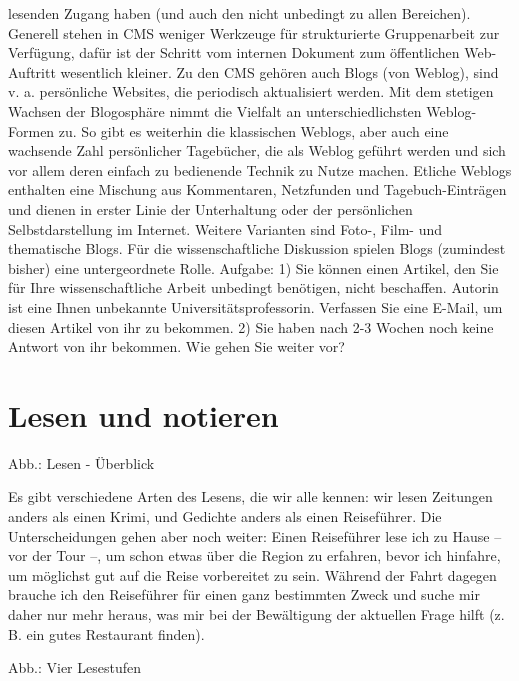 \documentclass[]{book}
\theoremstyle{definition}
\theoremstyle{definition}
\theoremstyle{definition}
\theoremstyle{remark}
\begin{document}
lesenden Zugang haben (und auch den nicht unbedingt zu allen Bereichen).
Generell stehen in CMS weniger Werkzeuge für strukturierte Gruppenarbeit
zur Verfügung, dafür ist der Schritt vom internen Dokument zum
öffentlichen Web-Auftritt wesentlich kleiner. Zu den CMS gehören auch
Blogs (von Weblog), sind v. a. persönliche Websites, die periodisch
aktualisiert werden. Mit dem stetigen Wachsen der Blogosphäre nimmt die
Vielfalt an unterschiedlichsten Weblog-Formen zu. So gibt es weiterhin
die klassischen Weblogs, aber auch eine wachsende Zahl persönlicher
Tagebücher, die als Weblog geführt werden und sich vor allem deren
einfach zu bedienende Technik zu Nutze machen. Etliche Weblogs enthalten
eine Mischung aus Kommentaren, Netzfunden und Tagebuch-Einträgen und
dienen in erster Linie der Unterhaltung oder der persönlichen
Selbstdarstellung im Internet. Weitere Varianten sind Foto-, Film- und
thematische Blogs. Für die wissenschaftliche Diskussion spielen Blogs
(zumindest bisher) eine untergeordnete Rolle. Aufgabe: 1) Sie können
einen Artikel, den Sie für Ihre wissenschaftliche Arbeit unbedingt
benötigen, nicht beschaffen. Autorin ist eine Ihnen unbekannte
Universitätsprofessorin. Verfassen Sie eine E-Mail, um diesen Artikel
von ihr zu bekommen. 2) Sie haben nach 2-3 Wochen noch keine Antwort von
ihr bekommen. Wie gehen Sie weiter vor?

\chapter{Lesen und notieren}\label{lesen-und-notieren}

Abb.: Lesen - Überblick

Es gibt verschiedene Arten des Lesens, die wir alle kennen: wir lesen
Zeitungen anders als einen Krimi, und Gedichte anders als einen
Reiseführer. Die Unterscheidungen gehen aber noch weiter: Einen
Reiseführer lese ich zu Hause -- vor der Tour --, um schon etwas über
die Region zu erfahren, bevor ich hinfahre, um möglichst gut auf die
Reise vorbereitet zu sein. Während der Fahrt dagegen brauche ich den
Reiseführer für einen ganz bestimmten Zweck und suche mir daher nur mehr
heraus, was mir bei der Bewältigung der aktuellen Frage hilft (z. B. ein
gutes Restaurant finden).

Abb.: Vier Lesestufen
\end{document}

